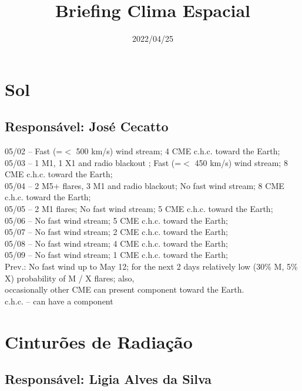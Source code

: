\documentclass[11pt, oneside]{article}
\title{Briefing Clima Espacial}
\date{2022/04/25}
\begin{document}
\maketitle 

 \section{Sol} 
 \subsection{Responsável: José Cecatto}

05/02 – Fast (=$<$ 500 km/s) wind stream; 4 CME c.h.c. toward the Earth; \\ 05/03 – 1 M1, 1 X1 and radio blackout ; Fast (=$<$ 450 km/s) wind stream; 8 CME c.h.c. toward the Earth; \\ 05/04 – 2 M5+ flares, 3 M1 and radio blackout; No fast wind stream; 8 CME c.h.c. toward the Earth; \\ 05/05 – 2 M1 flares; No fast wind stream; 5 CME c.h.c. toward the Earth; \\ 05/06 – No fast wind stream; 5 CME c.h.c. toward the Earth; \\ 05/07 – No fast wind stream; 2 CME c.h.c. toward the Earth; \\ 05/08 – No fast wind stream; 4 CME c.h.c. toward the Earth; \\ 05/09 – No fast wind stream; 1 CME c.h.c. toward the Earth; \\ Prev.: No fast wind up to May 12; for the next 2 days relatively low (30\% M, 5\% X) probability of M / X flares; also, \\ occasionally other CME can present component toward the Earth. \\ c.h.c. – can have a component\section{Cinturões de Radiação} 
 \subsection{Responsável: Ligia Alves da Silva} 
 
\end{document}
